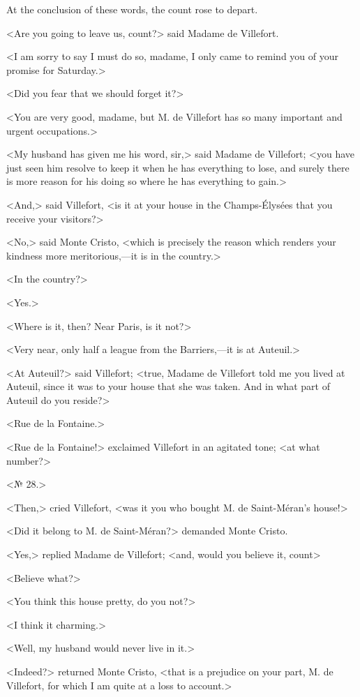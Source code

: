  At the conclusion of these words, the count rose to depart. 

 <Are you going to leave us, count?> said Madame de Villefort. 

 <I am sorry to say I must do so, madame, I only came to remind you of your promise for Saturday.> 

 <Did you fear that we should forget it?> 

 <You are very good, madame, but M. de Villefort has so many important and urgent occupations.> 

 <My husband has given me his word, sir,> said Madame de Villefort; <you have just seen him resolve to keep it when he has everything to lose, and surely there is more reason for his doing so where he has everything to gain.> 

 <And,> said Villefort, <is it at your house in the Champs-Élysées that you receive your visitors?> 

 <No,> said Monte Cristo, <which is precisely the reason which renders your kindness more meritorious,—it is in the country.> 

 <In the country?> 

 <Yes.> 

 <Where is it, then? Near Paris, is it not?> 

 <Very near, only half a league from the Barriers,—it is at Auteuil.> 

 <At Auteuil?> said Villefort; <true, Madame de Villefort told me you lived at Auteuil, since it was to your house that she was taken. And in what part of Auteuil do you reside?> 

 <Rue de la Fontaine.> 

 <Rue de la Fontaine!> exclaimed Villefort in an agitated tone; <at what number?> 

 <№ 28.> 

 <Then,> cried Villefort, <was it you who bought M. de Saint-Méran's house!> 

 <Did it belong to M. de Saint-Méran?> demanded Monte Cristo. 

 <Yes,> replied Madame de Villefort; <and, would you believe it, count\longdash> 

 <Believe what?> 

 <You think this house pretty, do you not?> 

 <I think it charming.> 

 <Well, my husband would never live in it.> 

 <Indeed?> returned Monte Cristo, <that is a prejudice on your part, M. de Villefort, for which I am quite at a loss to account.> 

